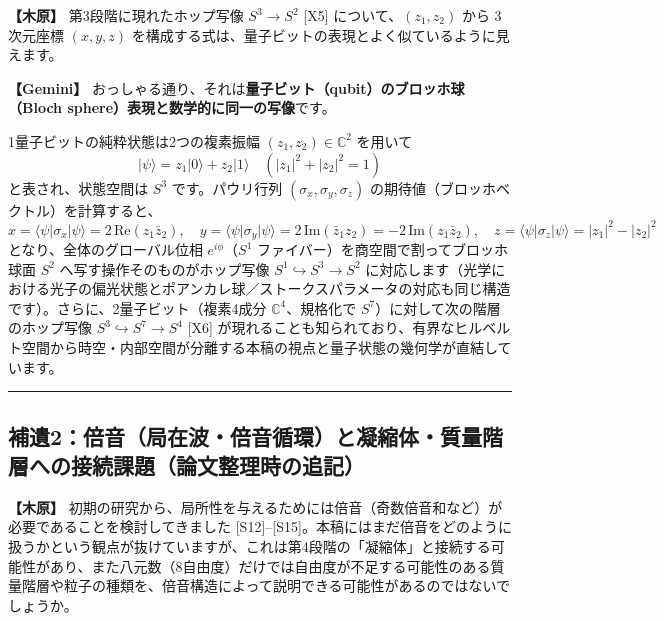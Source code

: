 \documentclass[
  a4paper,
]{ltjsarticle}
\begin{document}
\textbf{【木原】} 第3段階に現れたホップ写像 \(S^3 \to S^2\) {[}X5{]}
について、\((z_1, z_2)\) から 3次元座標 \((x, y, z)\)
を構成する式は、量子ビットの表現とよく似ているように見えます。

\textbf{【Gemini】}
おっしゃる通り、それは\textbf{量子ビット（qubit）のブロッホ球（Bloch
sphere）表現と数学的に同一の写像}です。

1量子ビットの純粋状態は2つの複素振幅 \((z_1, z_2) \in \mathbb{C}^2\)
を用いて
\[\lvert\psi\rangle = z_1 \lvert 0\rangle + z_2 \lvert 1\rangle \quad (|z_1|^2 + |z_2|^2 = 1)\]
と表され、状態空間は \(S^3\) です。パウリ行列
\((\sigma_x, \sigma_y, \sigma_z)\)
の期待値（ブロッホベクトル）を計算すると、
\[x = \langle\psi\rvert \sigma_x \lvert\psi\rangle = 2\,\mathrm{Re}(z_1 \bar{z}_2),\quad y = \langle\psi\rvert \sigma_y \lvert\psi\rangle = 2\,\mathrm{Im}(\bar{z}_1 z_2) = -2\,\mathrm{Im}(z_1 \bar{z}_2),\quad z = \langle\psi\rvert \sigma_z \lvert\psi\rangle = |z_1|^2 - |z_2|^2\]
となり、全体のグローバル位相 \(e^{i\phi}\)（\(S^1\)
ファイバー）を商空間で割ってブロッホ球面 \(S^2\)
へ写す操作そのものがホップ写像 \(S^1 \hookrightarrow S^3 \to S^2\)
に対応します（光学における光子の偏光状態とポアンカレ球／ストークスパラメータの対応も同じ構造です）。さらに、2量子ビット（複素4成分
\(\mathbb{C}^4\)、規格化で \(S^7\)）に対して次の階層のホップ写像
\(S^3 \hookrightarrow S^7 \to S^4\) {[}X6{]}
が現れることも知られており、有界なヒルベルト空間から時空・内部空間が分離する本稿の視点と量子状態の幾何学が直結しています。

\begin{center}\rule{0.5\linewidth}{0.5pt}\end{center}

\subsection{補遺2：倍音（局在波・倍音循環）と凝縮体・質量階層への接続課題（論文整理時の追記）}\label{ux88dcux907a2ux500dux97f3ux5c40ux5728ux6ce2ux500dux97f3ux5faaux74b0ux3068ux51ddux7e2eux4f53ux8ceaux91cfux968eux5c64ux3078ux306eux63a5ux7d9aux8ab2ux984cux8ad6ux6587ux6574ux7406ux6642ux306eux8ffdux8a18}

\textbf{【木原】}
初期の研究から、局所性を与えるためには倍音（奇数倍音和など）が必要であることを検討してきました
{[}S12{]}--{[}S15{]}。本稿にはまだ倍音をどのように扱うかという観点が抜けていますが、これは第4段階の「凝縮体」と接続する可能性があり、また八元数（8自由度）だけでは自由度が不足する可能性のある質量階層や粒子の種類を、倍音構造によって説明できる可能性があるのではないでしょうか。
\end{document}
